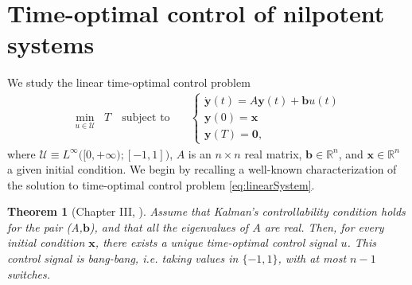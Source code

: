 \documentclass[11pt]{amsart}
\newcommand{\RR}{\mathbb{R}}
\newtheorem{theorem}{Theorem}[section]
\theoremstyle{definition}
\theoremstyle{remark}
\numberwithin{equation}{section}
\begin{document}
 \section{Time-optimal control of nilpotent systems}
We study the linear time-optimal control problem
\begin{align}\label{eq:linearSystem}
 \underset{u\in\mathcal{U}}{\min} \;\;T\quad 
 \text{subject to} \quad
 &\begin{cases}\dot{\bm{y}}(t)=A\bm{y}(t)+\bm{b}u(t)\\
 \bm{y}(0)=\bm{x}\\
 \bm{y}(T)=\bm{0},
 \end{cases}
\end{align}
where $\mathcal{U}\equiv L^{\infty}\bigl([0,+\infty);[-1,1]\bigr)$, $A$ is an $n\times n$ real matrix, $\bm{b}\in\RR^n$, and $\bm{x}\in\RR^n$ a given initial condition. We begin by recalling a well-known characterization of the solution to time-optimal control problem \eqref{eq:linearSystem}.

\begin{theorem}[Chapter III, \cite{PMP}]\label{switching} Assume that Kalman's controllability condition holds for the pair (A,$\bm{b}$), and that all the eigenvalues of $A$ are real. Then, for every initial condition $\bm{x}$, there exists a unique time-optimal control signal $u$. This control signal is bang-bang, i.e. taking values in $\{-1,1\}$, with at most $n-1$ switches. 
\end{theorem}
\end{document}
